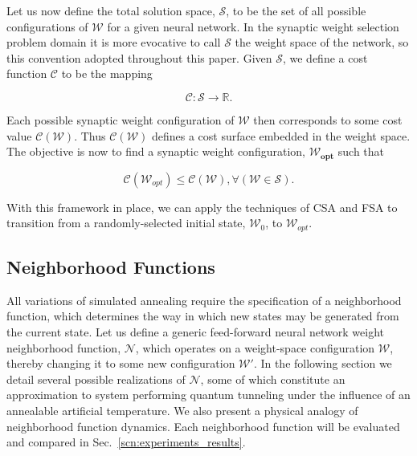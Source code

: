 \documentclass[10pt,journal,cspaper,compsoc]{IEEEtran}
\begin{document}
Let us now define the total solution space, $\boldsymbol{\mathcal{S}}$, to be the set of all possible configurations of $\boldsymbol{\mathcal{W}}$ for a given neural network. In the synaptic weight selection problem domain it is more evocative to call $\boldsymbol{\mathcal{S}}$ the weight space of the network, so this convention adopted throughout this paper. Given $\boldsymbol{\mathcal{S}}$, we define a cost function $ \mathcal{C}$ to be the mapping

\begin{equation*} \label{eq:cost_mapping}
\mathcal{C} : \boldsymbol{\mathcal{S}} \rightarrow \mathbb{R}.
\end{equation*}


Each possible synaptic weight configuration of $\boldsymbol{\mathcal{W}}$ then corresponds to some cost value $\mathcal{C}(\boldsymbol{\mathcal{W}})$. Thus $\mathcal{C}(\boldsymbol{\mathcal{W}})$ defines a cost surface embedded  in the weight space. The objective is now to find a synaptic weight configuration, $\boldsymbol{\mathcal{W}_{opt}}$ such that 

\begin{equation*} \label{eq:optimal_definition}
\mathcal{C}(\boldsymbol{\mathcal{W}}_{opt}) \leq \mathcal{C}\left( \boldsymbol{\mathcal{W}}\right) , \forall\left(  \boldsymbol{\mathcal{W}} \in \boldsymbol{\mathcal{S}}\right) .
\end{equation*}

With this framework in place, we can apply the techniques of CSA and FSA to transition from a randomly-selected initial state, $\boldsymbol{\mathcal{W}}_0$, to $\boldsymbol{\mathcal{W}}_{opt}$.



\subsection{Neighborhood Functions}
\label{scn:neighborhood_fuctions}

All variations of simulated annealing require the specification of a neighborhood function, which determines the way in which new states may be generated from the current state. Let us define a generic feed-forward neural network weight neighborhood function, $\mathcal{N}$, which operates on a weight-space configuration $\boldsymbol{\mathcal{W}}$, thereby changing it to some new configuration $\boldsymbol{\mathcal{W}}'$. In the following section we detail several possible realizations of $\mathcal{N}$, some of which constitute an approximation to system performing quantum tunneling under the influence of an annealable artificial temperature. We also present a physical analogy of neighborhood function dynamics. Each neighborhood function will be evaluated and compared in Sec.~\ref{scn:experiments_results}.
\end{document}
